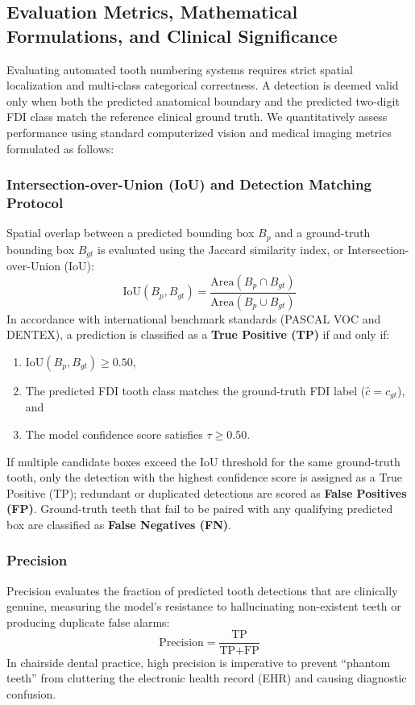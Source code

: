 \documentclass[10pt,journal,compsoc]{IEEEtran}
\begin{document}
\subsection{Evaluation Metrics, Mathematical Formulations, and Clinical Significance}
Evaluating automated tooth numbering systems requires strict spatial localization and multi-class categorical correctness. A detection is deemed valid only when both the predicted anatomical boundary and the predicted two-digit FDI class match the reference clinical ground truth. We quantitatively assess performance using standard computerized vision and medical imaging metrics formulated as follows:

\subsubsection{Intersection-over-Union (IoU) and Detection Matching Protocol}
Spatial overlap between a predicted bounding box $B_p$ and a ground-truth bounding box $B_{gt}$ is evaluated using the Jaccard similarity index, or Intersection-over-Union ($\text{IoU}$):
\begin{equation}
\text{IoU}(B_p, B_{gt}) = \frac{\text{Area}(B_p \cap B_{gt})}{\text{Area}(B_p \cup B_{gt})}
\end{equation}
In accordance with international benchmark standards (PASCAL VOC and DENTEX), a prediction is classified as a \textbf{True Positive (TP)} if and only if:
\begin{enumerate}
    \item $\text{IoU}(B_p, B_{gt}) \ge 0.50$,
    \item The predicted FDI tooth class matches the ground-truth FDI label ($\hat{c} = c_{gt}$), and
    \item The model confidence score satisfies $\tau \ge 0.50$.
\end{enumerate}
If multiple candidate boxes exceed the IoU threshold for the same ground-truth tooth, only the detection with the highest confidence score is assigned as a True Positive ($\text{TP}$); redundant or duplicated detections are scored as \textbf{False Positives (FP)}. Ground-truth teeth that fail to be paired with any qualifying predicted box are classified as \textbf{False Negatives (FN)}.

\subsubsection{Precision}
Precision evaluates the fraction of predicted tooth detections that are clinically genuine, measuring the model's resistance to hallucinating non-existent teeth or producing duplicate false alarms:
\begin{equation}
\text{Precision} = \frac{\text{TP}}{\text{TP} + \text{FP}}
\end{equation}
In chairside dental practice, high precision is imperative to prevent ``phantom teeth'' from cluttering the electronic health record (EHR) and causing diagnostic confusion.
\end{document}
